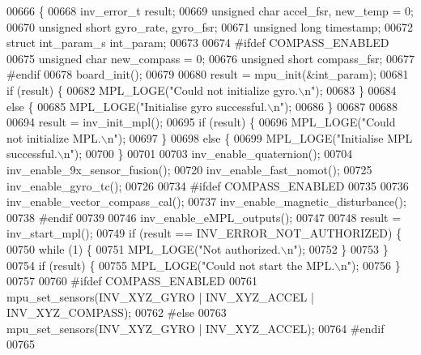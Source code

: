 \begin{DoxyCode}
00666 \{ 
00668     inv\_error\_t result;
00669     \textcolor{keywordtype}{unsigned} \textcolor{keywordtype}{char} accel\_fsr,  new\_temp = 0;
00670     \textcolor{keywordtype}{unsigned} \textcolor{keywordtype}{short} gyro\_rate, gyro\_fsr;
00671     \textcolor{keywordtype}{unsigned} \textcolor{keywordtype}{long} timestamp;
00672     \textcolor{keyword}{struct }int\_param\_s int\_param;
00673 
00674 \textcolor{preprocessor}{#ifdef COMPASS\_ENABLED}
00675     \textcolor{keywordtype}{unsigned} \textcolor{keywordtype}{char} new\_compass = 0;
00676     \textcolor{keywordtype}{unsigned} \textcolor{keywordtype}{short} compass\_fsr;
00677 \textcolor{preprocessor}{#endif}
00678     board_init(); 
00679  
00680   result = mpu\_init(&int\_param);
00681   \textcolor{keywordflow}{if} (result) \{
00682       MPL\_LOGE(\textcolor{stringliteral}{"Could not initialize gyro.\(\backslash\)n"});
00683   \}
00684   \textcolor{keywordflow}{else} \{
00685       MPL\_LOGE(\textcolor{stringliteral}{"Initialise gyro successful.\(\backslash\)n"});
00686     \}
00687   
00688 
00694   result = inv\_init\_mpl();
00695   \textcolor{keywordflow}{if} (result) \{
00696       MPL\_LOGE(\textcolor{stringliteral}{"Could not initialize MPL.\(\backslash\)n"});
00697   \}
00698   \textcolor{keywordflow}{else} \{
00699       MPL\_LOGE(\textcolor{stringliteral}{"Initialise MPL successful.\(\backslash\)n"});
00700   \}
00701 
00703     inv\_enable\_quaternion();
00704     inv\_enable\_9x\_sensor\_fusion();
00720     inv\_enable\_fast\_nomot();
00725     inv\_enable\_gyro\_tc();
00726 
00734 \textcolor{preprocessor}{#ifdef COMPASS\_ENABLED}
00735 
00736     inv\_enable\_vector\_compass\_cal();
00737     inv\_enable\_magnetic\_disturbance();
00738 \textcolor{preprocessor}{#endif}
00739 
00746     inv\_enable\_eMPL\_outputs();
00747 
00748   result = inv\_start\_mpl();
00749   \textcolor{keywordflow}{if} (result == INV\_ERROR\_NOT\_AUTHORIZED) \{
00750       \textcolor{keywordflow}{while} (1) \{
00751           MPL\_LOGE(\textcolor{stringliteral}{"Not authorized.\(\backslash\)n"});
00752       \}
00753   \}
00754   \textcolor{keywordflow}{if} (result) \{
00755       MPL\_LOGE(\textcolor{stringliteral}{"Could not start the MPL.\(\backslash\)n"});
00756   \}
00757 
00760 \textcolor{preprocessor}{#ifdef COMPASS\_ENABLED}
00761     mpu\_set\_sensors(INV\_XYZ\_GYRO | INV\_XYZ\_ACCEL | INV\_XYZ\_COMPASS);
00762 \textcolor{preprocessor}{#else}
00763     mpu\_set\_sensors(INV\_XYZ\_GYRO | INV\_XYZ\_ACCEL);
00764 \textcolor{preprocessor}{#endif}
00765 

\end{DoxyCode}
